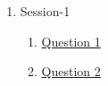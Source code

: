 \clearpage
\renewcommand{\notetitle}{Table of Contents}
\label{toc}
\begin{enumerate}

\item Session-1
\begin{enumerate}
\item \hyperref[202501120904]{Question 1}
\item \hyperref[202501121340]{Question 2}
\end{enumerate}
\end{enumerate}

\newpage
